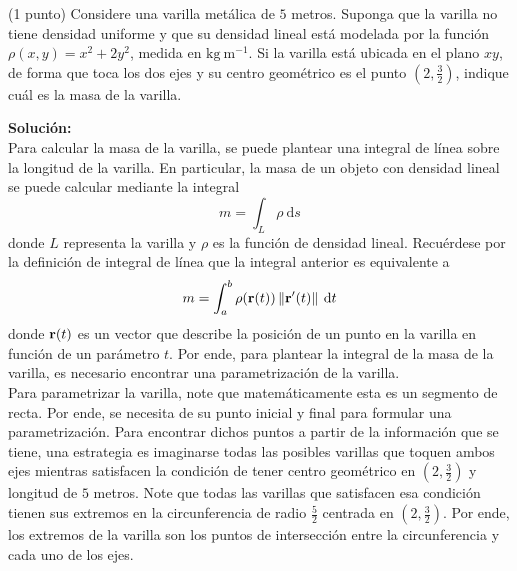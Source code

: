 \documentclass{fmbvecto}
\begin{document}
\begin{problema}
    
    (1 punto) Considere una varilla metálica de \(5\) metros. Suponga que la varilla no tiene densidad uniforme y que su densidad lineal está modelada por la función \(\rho(x, y) = x^2 + 2y^2\), medida en \(\text{kg} \: \text{m}^{-1}\). Si la varilla está ubicada en el plano \(xy\), de forma que toca los dos ejes y su centro geométrico es el punto \(\left(2, \frac{3}{2}\right)\), indique cuál es la masa de la varilla.

\tcblower
\textbf{Solución:}\\

Para calcular la masa de la varilla, se puede plantear una integral de línea sobre la longitud de la varilla. En particular, la masa de un objeto con densidad lineal se puede calcular mediante la integral 
\[m = \int_{L} \rho \: \mathrm{d}s\]
donde \(L\) representa la varilla y \(\rho\) es la función de densidad lineal. Recuérdese por la definición de integral de línea que la integral anterior es equivalente a
\[m = \int_{a}^{b} \rho(\boldsymbol{{\mathbf{r}}}(t)) \left\lVert \boldsymbol{{\mathbf{r}}}'(t) \right\rVert \: \mathrm{d}t\]
donde \(\boldsymbol{{\mathbf{r}}}(t)\) es un vector que describe la posición de un punto en la varilla en función de un parámetro \(t\). Por ende, para plantear la integral de la masa de la varilla, es necesario encontrar una parametrización de la varilla.\\

Para parametrizar la varilla, note que matemáticamente esta es un segmento de recta. Por ende, se necesita de su punto inicial y final para formular una parametrización. Para encontrar dichos puntos a partir de la información que se tiene, una estrategia es imaginarse todas las posibles varillas que toquen ambos ejes mientras satisfacen la condición de tener centro geométrico en \((2, \frac{3}{2})\) y longitud de \(5\) metros. Note que todas las varillas que satisfacen esa condición tienen sus extremos en la circunferencia de radio \(\frac{5}{2}\) centrada en \((2, \frac{3}{2})\). Por ende, los extremos de la varilla son los puntos de intersección entre la circunferencia y cada uno de los ejes.\\


\end{problema}
\end{document}
